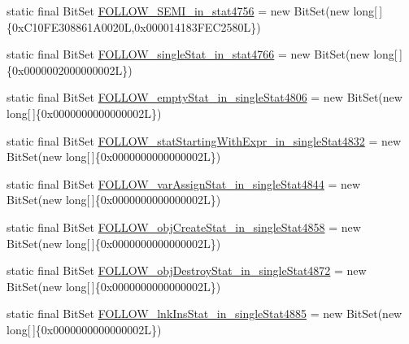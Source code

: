 \begin{DoxyCompactItemize}
static final Bit\-Set \hyperlink{classorg_1_1tzi_1_1use_1_1parser_1_1testsuite_1_1_test_suite_parser_a69241ae02722681a51529453545209ef}{F\-O\-L\-L\-O\-W\-\_\-\-S\-E\-M\-I\-\_\-in\-\_\-stat4756} = new Bit\-Set(new long\mbox{[}$\,$\mbox{]}\{0x\-C10\-F\-E308861\-A0020\-L,0x000014183\-F\-E\-C2580\-L\})
\item 
static final Bit\-Set \hyperlink{classorg_1_1tzi_1_1use_1_1parser_1_1testsuite_1_1_test_suite_parser_ade45e93215c0c4fafe3df6d91a230d02}{F\-O\-L\-L\-O\-W\-\_\-single\-Stat\-\_\-in\-\_\-stat4766} = new Bit\-Set(new long\mbox{[}$\,$\mbox{]}\{0x0000002000000002\-L\})
\item 
static final Bit\-Set \hyperlink{classorg_1_1tzi_1_1use_1_1parser_1_1testsuite_1_1_test_suite_parser_af98c9deb695f7155b77012948adc627c}{F\-O\-L\-L\-O\-W\-\_\-empty\-Stat\-\_\-in\-\_\-single\-Stat4806} = new Bit\-Set(new long\mbox{[}$\,$\mbox{]}\{0x0000000000000002\-L\})
\item 
static final Bit\-Set \hyperlink{classorg_1_1tzi_1_1use_1_1parser_1_1testsuite_1_1_test_suite_parser_a7d1138853dfcc7f7f59376635d1f8603}{F\-O\-L\-L\-O\-W\-\_\-stat\-Starting\-With\-Expr\-\_\-in\-\_\-single\-Stat4832} = new Bit\-Set(new long\mbox{[}$\,$\mbox{]}\{0x0000000000000002\-L\})
\item 
static final Bit\-Set \hyperlink{classorg_1_1tzi_1_1use_1_1parser_1_1testsuite_1_1_test_suite_parser_aac9c0a60a0b10f255be83f933317aa43}{F\-O\-L\-L\-O\-W\-\_\-var\-Assign\-Stat\-\_\-in\-\_\-single\-Stat4844} = new Bit\-Set(new long\mbox{[}$\,$\mbox{]}\{0x0000000000000002\-L\})
\item 
static final Bit\-Set \hyperlink{classorg_1_1tzi_1_1use_1_1parser_1_1testsuite_1_1_test_suite_parser_a804eba429357d6e172fe7ad4c5cf2b23}{F\-O\-L\-L\-O\-W\-\_\-obj\-Create\-Stat\-\_\-in\-\_\-single\-Stat4858} = new Bit\-Set(new long\mbox{[}$\,$\mbox{]}\{0x0000000000000002\-L\})
\item 
static final Bit\-Set \hyperlink{classorg_1_1tzi_1_1use_1_1parser_1_1testsuite_1_1_test_suite_parser_a98d1358d2af925b6642bdac2bdf6e3c1}{F\-O\-L\-L\-O\-W\-\_\-obj\-Destroy\-Stat\-\_\-in\-\_\-single\-Stat4872} = new Bit\-Set(new long\mbox{[}$\,$\mbox{]}\{0x0000000000000002\-L\})
\item 
static final Bit\-Set \hyperlink{classorg_1_1tzi_1_1use_1_1parser_1_1testsuite_1_1_test_suite_parser_a21ae78aab99170a874e2475a86ae6249}{F\-O\-L\-L\-O\-W\-\_\-lnk\-Ins\-Stat\-\_\-in\-\_\-single\-Stat4885} = new Bit\-Set(new long\mbox{[}$\,$\mbox{]}\{0x0000000000000002\-L\})
\item 

\end{DoxyCompactItemize}
